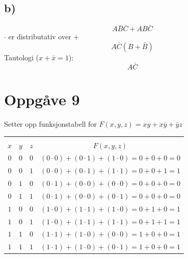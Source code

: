 \documentclass[12pt,a4paper]{article}
\begin{document}
    \subsection{b)}
      \begin{equation}
        A\bar{B}\bar{C} + AB\bar{C}
      \end{equation}
      $\cdot$ er distributativ over $+$
      \begin{equation}
        A\bar{C}(B+\bar{B})
      \end{equation}
      Tautologi ($x+\bar{x}=1$):
      \begin{equation}
        A\bar{C}
      \end{equation}
    
  \section{Oppgåve 9}
    Setter opp funksjonstabell for $F(x,y,z)=xy+x\bar{y}+\bar{y}z$
    \begin{center}
      \begin{tabular}{ |c|c|c|c| }
        \hline
        &&& \\
        $x$ & $y$ & $z$ & $F(x,y,z)$ \\
        \hline
        $0$ & $0$ & $0$ & $(0\cdot0) + (0\cdot1) + (1\cdot0)=0+0+0=0$ \\
        \hline
        $0$ & $0$ & $1$ & $(0\cdot0) + (0\cdot1) + (1\cdot1)=0+0+1=1$ \\
        \hline
        $0$ & $1$ & $0$ & $(0\cdot1) + (0\cdot0) + (0\cdot0)=0+0+0=0$ \\
        \hline
        $0$ & $1$ & $1$ & $(0\cdot1) + (0\cdot0) + (0\cdot1)=0+0+0=0$ \\
        \hline
        $1$ & $0$ & $0$ & $(1\cdot0) + (1\cdot1) + (1\cdot0)=0+1+0=1$ \\
        \hline
        $1$ & $0$ & $1$ & $(1\cdot0) + (1\cdot1) + (1\cdot1)=0+1+1=1$ \\
        \hline
        $1$ & $1$ & $0$ & $(1\cdot1) + (1\cdot0) + (0\cdot0)=1+0+0=1$ \\
        \hline
        $1$ & $1$ & $1$ & $(1\cdot1) + (1\cdot0) + (0\cdot1)=1+0+0=1$ \\
        \hline
      \end{tabular}
    \end{center}
\end{document}
